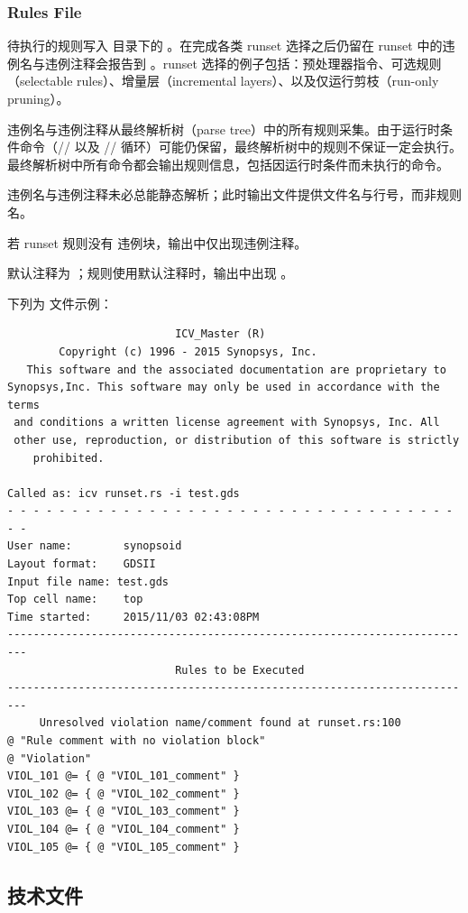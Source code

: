 \subsubsection*{Rules File}

待执行的规则写入  目录下的 。在完成各类 runset 选择之后仍留在 runset 中的违例名与违例注释会报告到 。runset 选择的例子包括：预处理器指令、可选规则（selectable rules）、增量层（incremental layers）、以及仅运行剪枝（run-only pruning）。

违例名与违例注释从最终解析树（parse tree）中的所有规则采集。由于运行时条件命令（// 以及 // 循环）可能仍保留，最终解析树中的规则不保证一定会执行。最终解析树中所有命令都会输出规则信息，包括因运行时条件而未执行的命令。

违例名与违例注释未必总能静态解析；此时输出文件提供文件名与行号，而非规则名。

若 runset 规则没有  违例块，输出中仅出现违例注释。

默认注释为 ；规则使用默认注释时，输出中出现 。

下列为  文件示例：
\begin{lstlisting}
                          ICV_Master (R)
        Copyright (c) 1996 - 2015 Synopsys, Inc.
   This software and the associated documentation are proprietary to
Synopsys,Inc. This software may only be used in accordance with the terms
 and conditions a written license agreement with Synopsys, Inc. All
 other use, reproduction, or distribution of this software is strictly
    prohibited.

Called as: icv runset.rs -i test.gds
- - - - - - - - - - - - - - - - - - - - - - - - - - - - - - - - - - - - -
User name:        synopsoid
Layout format:    GDSII
Input file name: test.gds
Top cell name:    top
Time started:     2015/11/03 02:43:08PM
-------------------------------------------------------------------------
                          Rules to be Executed
-------------------------------------------------------------------------
     Unresolved violation name/comment found at runset.rs:100
@ "Rule comment with no violation block"
@ "Violation"
VIOL_101 @= { @ "VIOL_101_comment" }
VIOL_102 @= { @ "VIOL_102_comment" }
VIOL_103 @= { @ "VIOL_103_comment" }
VIOL_104 @= { @ "VIOL_104_comment" }
VIOL_105 @= { @ "VIOL_105_comment" }
\end{lstlisting}

\subsection{技术文件}
